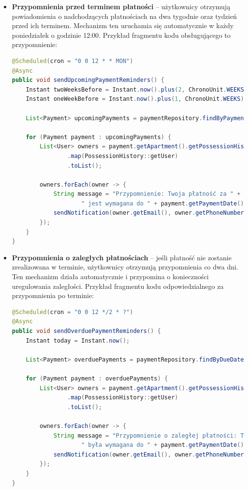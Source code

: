 \begin{itemize}
    \item \textbf{Przypomnienia przed terminem płatności} -- użytkownicy otrzymują powiadomienia o nadchodzących płatnościach na dwa tygodnie oraz tydzień przed ich terminem. Mechanizm ten uruchamia się automatycznie w każdy poniedziałek o godzinie 12:00. Przykład fragmentu kodu obsługującego to przypomnienie:

\begin{lstlisting}[language=Java, style=JavaStyle, caption=Przypomnienie o nadchodzących płatnościach]
@Scheduled(cron = "0 0 12 * * MON")
@Async
public void sendUpcomingPaymentReminders() {
    Instant twoWeeksBefore = Instant.now().plus(2, ChronoUnit.WEEKS);
    Instant oneWeekBefore = Instant.now().plus(1, ChronoUnit.WEEKS);

    List<Payment> upcomingPayments = paymentRepository.findByPaymentDateBetween(twoWeeksBefore, oneWeekBefore);

    for (Payment payment : upcomingPayments) {
        List<User> owners = payment.getApartment().getPossessionHistories().stream()
                .map(PossessionHistory::getUser)
                .toList();

        owners.forEach(owner -> {
            String message = "Przypomnienie: Twoja płatność za " + payment.getDescription() +
                    " jest wymagana do " + payment.getPaymentDate() + ".";
            sendNotification(owner.getEmail(), owner.getPhoneNumber(), message);
        });
    }
}
\end{lstlisting}

    \item \textbf{Przypomnienia o zaległych płatnościach} -- jeśli płatność nie zostanie zrealizowana w terminie, użytkownicy otrzymują przypomnienia co dwa dni. Ten mechanizm działa automatycznie i przypomina o konieczności uregulowania zaległości. Przykład fragmentu kodu odpowiedzialnego za przypomnienia po terminie:

\begin{lstlisting}[language=Java, style=JavaStyle, caption=Przypomnienie o zaległych płatnościach]
@Scheduled(cron = "0 0 12 */2 * ?")
@Async
public void sendOverduePaymentReminders() {
    Instant today = Instant.now();

    List<Payment> overduePayments = paymentRepository.findByDueDateBeforeAndIsPaidFalse(today);

    for (Payment payment : overduePayments) {
        List<User> owners = payment.getApartment().getPossessionHistories().stream()
                .map(PossessionHistory::getUser)
                .toList();

        owners.forEach(owner -> {
            String message = "Przypomnienie o zaległej płatności: Twoja płatność za " + payment.getDescription() +
                    " była wymagana do " + payment.getPaymentDate() + ". Prosimy o dokonanie płatności jak najszybciej.";
            sendNotification(owner.getEmail(), owner.getPhoneNumber(), message);
        });
    }
}
\end{lstlisting}
\end{itemize}

